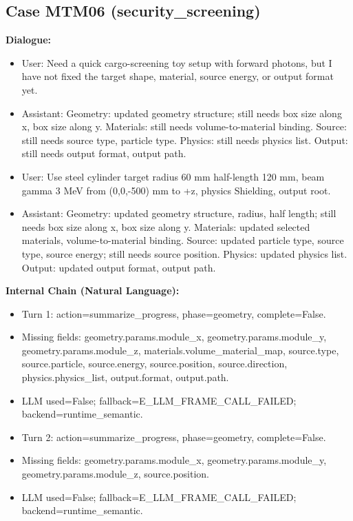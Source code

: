 \documentclass[11pt]{ctexart}
\begin{document}
\subsection{Case MTM06 (security\_screening)}
\textbf{Dialogue:}
\begin{itemize}
\item User: Need a quick cargo-screening toy setup with forward photons, but I have not fixed the target shape, material, source energy, or output format yet.
\item Assistant: Geometry: updated geometry structure; still needs box size along x, box size along y. Materials: still needs volume-to-material binding. Source: still needs source type, particle type. Physics: still needs physics list. Output: still needs output format, output path.
\item User: Use steel cylinder target radius 60 mm half-length 120 mm, beam gamma 3 MeV from (0,0,-500) mm to +z, physics Shielding, output root.
\item Assistant: Geometry: updated geometry structure, radius, half length; still needs box size along x, box size along y. Materials: updated selected materials, volume-to-material binding. Source: updated particle type, source type, source energy; still needs source position. Physics: updated physics list. Output: updated output format, output path.
\end{itemize}
\textbf{Internal Chain (Natural Language):}
\begin{itemize}
\item Turn 1: action=summarize\_progress, phase=geometry, complete=False.
\item Missing fields: geometry.params.module\_x, geometry.params.module\_y, geometry.params.module\_z, materials.volume\_material\_map, source.type, source.particle, source.energy, source.position, source.direction, physics.physics\_list, output.format, output.path.
\item LLM used=False; fallback=E\_LLM\_FRAME\_CALL\_FAILED; backend=runtime\_semantic.
\item Turn 2: action=summarize\_progress, phase=geometry, complete=False.
\item Missing fields: geometry.params.module\_x, geometry.params.module\_y, geometry.params.module\_z, source.position.
\item LLM used=False; fallback=E\_LLM\_FRAME\_CALL\_FAILED; backend=runtime\_semantic.
\end{itemize}
\end{document}
